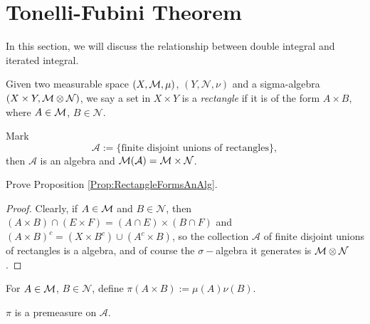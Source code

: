 \section{Tonelli-Fubini Theorem}
\begin{rem}
    In this section, we will discuss the relationship between 
    double integral and iterated integral.
\end{rem}
\begin{defn}
    \label{Defn:Rectangle}
    Given two measurable space $(X,\mathcal{M},\mu)$, $(Y,\mathcal{N},\nu)$ 
    and a sigma-algebra $(X\times Y,\mathcal{M}\otimes\mathcal{N})$, we say 
    a set in $X\times Y$ is a \textit{rectangle} if it is of 
    the form $A\times B$, where $A\in\mathcal{M}$, $B\in\mathcal{N}$.
\end{defn}
\begin{prop}
    \label{Prop:RectangleFormsAnAlg}
    Mark 
    \begin{displaymath}
    \mathcal{A}:=\{\text{finite disjoint unions of rectangles}\},
    \end{displaymath} 
    then $\mathcal{A}$ is an algebra and 
    $\mathcal{M}(\mathcal{A})=\mathcal{M}\times\mathcal{N}$.
\end{prop}
\begin{exc}
    Prove Proposition \ref{Prop:RectangleFormsAnAlg}.
\end{exc}
\begin{proof}
    Clearly, if $A\in\mathcal{M}$ and $B\in\mathcal{N}$, then $(A\times B)
    \cap(E\times F)=(A\cap E)\times(B\cap F)$ and $(A\times B)^c
    =(X\times B^c)\cup(A^c\times B)$, so the collection $\mathcal{A}$
    of finite disjoint unions of rectangles is a algebra, and of 
    course the $\sigma-$algebra it generates is $\mathcal{M}\otimes\mathcal{N}$.
\end{proof}
\begin{defn}
    \label{Defn:PremeasureOnA}
    For $A\in\mathcal{M}$, $B\in\mathcal{N}$, define 
    $\pi(A\times B):=\mu(A)\nu(B)$.
\end{defn}
\begin{prop}
    \label{Prop:PiIsAPremeas}
    $\pi$ is a premeasure on $\mathcal{A}$.
\end{prop}
